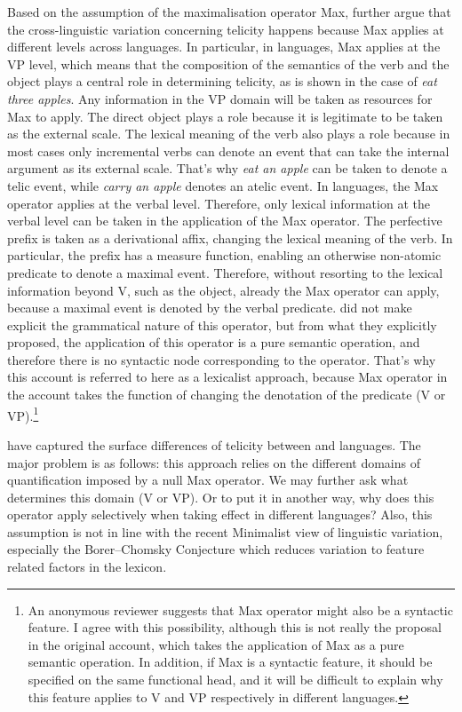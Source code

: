 \documentclass[output=paper]{langsci/langscibook}
\begin{document}
Based on the assumption of the maximalisation operator Max,
\textcite{filiprothstein2005} further argue that the cross-linguistic variation
concerning telicity happens because Max applies at different levels
across languages. In particular, in  languages, Max applies at
the VP level, which means that the composition of the semantics of the verb and
the object plays a central role in determining telicity, as is shown in the
case of \emph{eat three apples}. Any information in the VP domain will be
taken as resources for Max to apply. The direct object plays a role
because it is legitimate to be taken as the external scale. The lexical meaning
of the verb also plays a role because in most cases only incremental verbs can
denote an event that can take the internal argument as its external scale.
That's why \emph{eat an apple} can be taken to denote a telic event, while
\emph{carry an apple} denotes an atelic event. In  languages, the
Max operator applies at the verbal level. Therefore, only lexical
information at the verbal level can be taken in the application of the
Max operator. The perfective prefix is taken as a derivational affix,
changing the lexical meaning of the verb. In particular, the prefix has a
measure function, enabling an otherwise non-atomic predicate to denote a
maximal event. Therefore, without resorting to the lexical information beyond
V, such as the object, already the Max operator can apply, because a
maximal event is denoted by the verbal predicate. \textcite{filiprothstein2005}
did not make explicit the grammatical nature of this operator, but from what
they explicitly proposed, the application of this operator is a pure semantic
operation, and therefore there is no syntactic node corresponding to the
operator. That’s why this account is referred to here as a lexicalist approach,
because Max operator in the account takes the function of changing the
denotation of the predicate (V or VP).\footnote{An anonymous reviewer suggests
that Max operator might also be a syntactic feature. I agree with this
possibility, although this is not really the proposal in the original account,
which takes the application of Max as a pure semantic operation. In
addition, if Max is a syntactic feature, it should be specified on the
same functional head, and it will be difficult to explain why this feature
applies to V and VP respectively in different languages.}

\textcite{filiprothstein2005} have captured the surface differences of telicity
be\-tween  and  languages. The major problem is as follows: this
approach relies on the different domains of quantification imposed by a null
Max operator. We may further ask what determines this domain (V or VP).
Or to put it in another way, why does this operator apply selectively when
taking effect in different languages? Also, this assumption is not in line with
the recent Minimalist view of linguistic variation, especially the
Borer--Chomsky Conjecture \citep[cf.][]{Baker2008,RobHol2010} which
reduces variation to feature related factors in the lexicon.
\end{document}
